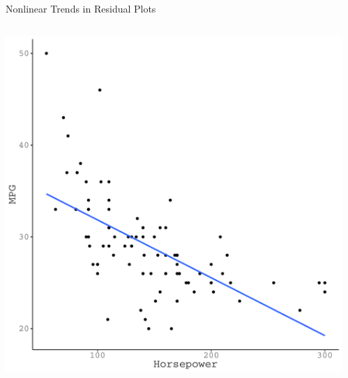 \documentclass[10pt]{beamer}\usepackage[]{graphicx}\usepackage[]{color}
\makeatletter
\def\maxwidth{ %
  \ifdim\Gin@nat@width>\linewidth
    \linewidth
  \else
    \Gin@nat@width
  \fi
}
\newenvironment{knitrout}{}{} %
\makeatother
\begin{document}
{\begin{frame}{Nonlinear Trends in Residual Plots}
\begin{columns}
\begin{column}{0.5\textwidth}
\begin{knitrout}\footnotesize
{}\color{fgcolor}

{\centering \includegraphics[width=\maxwidth]{figure/assumptions-unnamed-chunk-13-1} 

}


\end{knitrout}

\end{column}

\begin{column}{0.5\textwidth}

\begin{knitrout}\footnotesize
{}\color{fgcolor}


\end{knitrout}
\end{column}
\end{columns}
\end{frame}}
\end{document}
